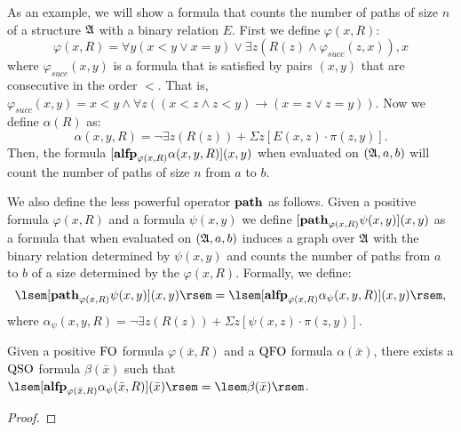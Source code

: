 As an example, we will show a formula that counts the number of paths of size $n$ of a structure $\mathfrak{A}$ with a binary relation $E$. First we define $\varphi(x,R)$:
$$
\varphi(x,R) = \forall y(x < y \vee x = y) \vee \exists z(R(z) \wedge \varphi_{succ}(z,x)),x
$$
where $\varphi_{succ}(x,y)$ is a formula that is satisfied by pairs $(x,y)$ that are consecutive in the order $<$. That is, $\varphi_{succ}(x,y) = x < y \wedge \forall z((x < z \wedge z < y) \to (x = z \vee z = y) )$. Now we define $\alpha(R)$ as:
$$
\alpha(x,y,R) = \neg \exists z(R(z)) + \Sigma z[E(x,z)\cdot \pi(z,y)].
$$
Then, the formula $[{\bf alfp}_{\varphi(x,R)} \alpha(x,y,R)](x,y)$ when evaluated on $(\mathfrak{A},a,b)$ will count the number of paths of size $n$ from $a$ to $b$.

We also define the less powerful operator ${\bf path}$ as follows. Given a positive formula $\varphi(x,R)$ and a formula $\psi(x,y)$ we define $[{\bf path}_{\varphi(x,R)} \psi(x,y)](x,y)$ as a formula that when evaluated on $(\mathfrak{A}, a, b)$ induces a graph over $\mathfrak{A}$ with the binary relation determined by $\psi(x,y)$ and counts the number of paths from $a$ to $b$ of a size determined by the $\varphi(x,R)$. Formally, we define:
$$
\sem{[\pth_{\varphi(x,R)} \psi(x,y)](x,y)} = \sem{[\alfp_{\varphi(x,R)} \alpha_{\psi}(x,y,R)](x,y)},
$$
where $\alpha_{\psi}(x,y,R) = \neg \exists z(R(z)) + \Sigma z[\psi(x,z)\cdot \pi(z,y)]$.


\begin{theorem}
	Given a positive ${\rm FO}$ formula $\varphi(\bar{x},R)$ and a ${\rm QFO}$ formula $\alpha(\bar{x})$, there exists a ${\rm QSO}$ formula $\beta(\bar{x})$ such that $\sem{[\alfp_{\varphi(\bar{x},R)} \alpha_{\psi}(\bar{x},R)](\bar{x})} = \sem{\beta(\bar{x})}$.
\end{theorem}
\begin{proof}
	
\end{proof}
